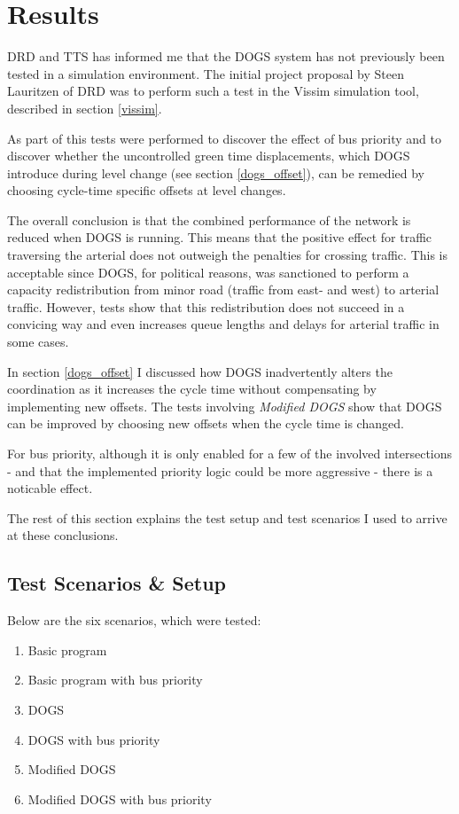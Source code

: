 \section{Results}
\label{test}
DRD and TTS has informed me that the DOGS system has not previously been tested in a simulation environment. The initial project proposal by Steen Lauritzen of DRD was to perform such a test in the Vissim simulation tool, described in section \ref{vissim}.

As part of this tests were performed to discover the effect of bus priority and to discover whether the uncontrolled green time displacements, which DOGS introduce during level change (see section \ref{dogs_offset}), can be remedied by choosing cycle-time specific offsets at level changes.

The overall conclusion is that the combined performance of the network is reduced when DOGS is running. This means that the positive effect for traffic traversing the arterial does not outweigh the penalties for crossing traffic. 
This is acceptable since DOGS, for political reasons, was sanctioned to perform a capacity redistribution from minor road (traffic from east- and west) to arterial traffic. However, tests show that this redistribution does not succeed in a convicing way and even increases queue lengths and delays for arterial traffic in some cases.

In section \ref{dogs_offset} I discussed how DOGS inadvertently alters the coordination as it increases the cycle time without compensating by implementing new offsets. The tests involving \textit{Modified DOGS} show that DOGS can be improved by choosing new offsets when the cycle time is changed.

For bus priority, although it is only enabled for a few of the involved intersections - and that the implemented priority logic could be more aggressive - there is a noticable effect.

The rest of this section explains the test setup and test scenarios I used to arrive at these conclusions. 

\subsection{Test Scenarios \& Setup}

Below are the six scenarios, which were tested:

\begin{enumerate}
\item Basic program
\item Basic program with bus priority
\item DOGS
\item DOGS with bus priority
\item Modified DOGS
\item Modified DOGS with bus priority
\end{enumerate}

